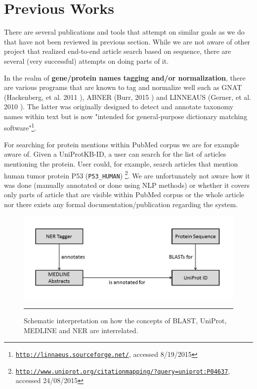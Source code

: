 
\section{Previous Works}

There are several publications and tools that attempt on similar goals as we do that have not been reviewed in previous section. While we are not aware of other project that realized end-to-end article search based on sequence, there are several (very successful) attempts on doing parts of it.

In the realm of \textbf{gene/protein names tagging and/or normalization}, there are various programs that are known to tag and normalize well such as GNAT (Hackenberg, et al. 2011 \citep{hakenberg2011gnat}), ABNER (Burr, 2015 \citep{settles2005abner}) and LINNEAUS (Gerner, et al. 2010 \citep{gerner2010linnaeus}). The latter was originally designed to detect and annotate taxonomy names within text but is now "intended for general-purpose dictionary matching software"\footnote{\href{http://linnaeus.sourceforge.net/}{\texttt{http://linnaeus.sourceforge.net/}}, accessed 8/19/2015}.

For searching for protein mentions within PubMed corpus we are for example aware of. Given a UniProtKB-ID, a user can search for the list of articles mentioning the protein. User could, for example, search articles that mention human tumor protein P53 (\texttt{P53\_HUMAN}) \footnote{\href{http://www.uniprot.org/citationmapping/?query=uniprot:P04637}{\texttt{http://www.uniprot.org/citationmapping/?query=uniprot:P04637}}, accessed 24/08/2015}. We are unfortunately not aware how it was done (manually annotated or done using NLP methods) or whether it covers only parts of article that are visible within PubMed corpus or the whole article nor there exists any formal documentation/publication regarding the system.

\begin{figure}[htbp]
  \centering
    \includegraphics[width=6in]{Figures/component_graph.png}
    \rule{35em}{0.5pt}
  \caption[Schematic interaction between BLAST, UniProt, MEDLINE and NER Tagger]{Schematic interpretation on how the concepts of BLAST, UniProt, MEDLINE and NER are interrelated.}
  \label{fig:SchematicInteraction}
\end{figure}